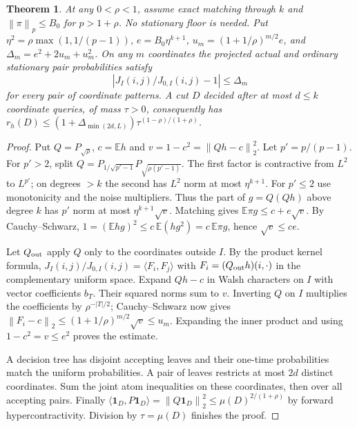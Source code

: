\documentclass[11pt]{article}
\newtheorem{theorem}{Theorem}[section]
\newcommand{\E}{\mathbb E}
\newcommand{\one}{\mathbf1}
\newcommand{\norm}[1]{\left\lVert#1\right\rVert}
\newcommand{\ip}[2]{\langle #1,#2\rangle}
\begin{document}
\begin{theorem}
At any $0<\rho<1$, assume exact matching through $k$ and $\norm\pi_p\le B_0$ for $p>1+\rho$. No stationary floor is needed. Put $\eta^2=\rho\max(1,1/(p-1))$, $e=B_0\eta^{k+1}$, $u_m=(1+1/\rho)^{m/2}e$, and $\Delta_m=e^2+2u_m+u_m^2$. On any $m$ coordinates the projected actual and ordinary stationary pair probabilities satisfy
\[
 \left|J_I(i,j)/J_{0,I}(i,j)-1\right|\le\Delta_m
\]
for every pair of coordinate patterns. A cut $D$ decided after at most $d\le k$ coordinate queries, of mass $\tau>0$, consequently has
$r_h(D)\le(1+\Delta_{\min(2d,L)})\tau^{(1-\rho)/(1+\rho)}$.
\end{theorem}
\begin{proof}
Put $Q=P_{\sqrt\rho}$, $c=\E h$ and $v=1-c^2=\norm{Qh-c}_2^2$. Let $p'=p/(p-1)$. For $p'>2$, split $Q=P_{1/\sqrt{p'-1}}P_{\sqrt{\rho(p'-1)}}$. The first factor is contractive from $L^2$ to $L^{p'}$; on degrees $>k$ the second has $L^2$ norm at most $\eta^{k+1}$. For $p'\le2$ use monotonicity and the noise multipliers. Thus the part of $g=Q(Qh)$ above degree $k$ has $p'$ norm at most $\eta^{k+1}\sqrt v$. Matching gives $\E\pi g\le c+e\sqrt v$. By Cauchy--Schwarz, $1=(\E hg)^2\le c\,\E(hg^2)=c\,\E\pi g$, hence $\sqrt v\le ce$.

Let $Q_{\rm out}$ apply $Q$ only to the coordinates outside $I$. By the product kernel formula, $J_I(i,j)/J_{0,I}(i,j)=\ip{F_i}{F_j}$ with $F_i=(Q_{\rm out}h)(i,\cdot)$ in the complementary uniform space. Expand $Qh-c$ in Walsh characters on $I$ with vector coefficients $b_T$. Their squared norms sum to $v$. Inverting $Q$ on $I$ multiplies the coefficients by $\rho^{-|T|/2}$; Cauchy--Schwarz now gives $\norm{F_i-c}_2\le (1+1/\rho)^{m/2}\sqrt v\le u_m$. Expanding the inner product and using $1-c^2=v\le e^2$ proves the estimate.

A decision tree has disjoint accepting leaves and their one-time probabilities match the uniform probabilities. A pair of leaves restricts at most $2d$ distinct coordinates. Sum the joint atom inequalities on these coordinates, then over all accepting pairs. Finally $\ip{\one_D}{P\one_D}=\norm{Q\one_D}_2^2\le\mu(D)^{2/(1+\rho)}$ by forward hypercontractivity. Division by $\tau=\mu(D)$ finishes the proof.
\end{proof}
\end{document}
